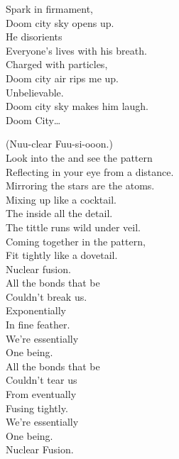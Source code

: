 Spark in firmament, \\
Doom city sky opens up. \\
He disorients \\
Everyone's lives with his breath. \\

Charged with particles, \\
Doom city air rips me up. \\
Unbelievable. \\
Doom city sky makes him laugh. \\

Doom City… \\





(Nuu-clear Fuu-si-ooon.) \\

Look into the  and see the pattern \\
Reflecting in your eye from a distance. \\
Mirroring the stars are the atoms. \\
Mixing up like a cocktail. \\

The  inside all the detail. \\
The tittle runs wild under veil. \\
Coming together in the pattern, \\
Fit tightly like a dovetail. \\

Nuclear fusion. \\

All the bonds that be \\
Couldn't break us. \\
Exponentially \\
In fine feather. \\
We're essentially \\
One being. \\

All the bonds that be \\
Couldn't tear us \\
From eventually \\
Fusing tightly. \\
We're essentially \\
One being. \\
Nuclear Fusion. \\

